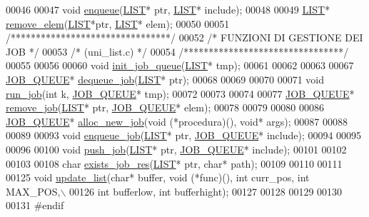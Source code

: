 \begin{DoxyCode}
00046 
00047 \textcolor{keywordtype}{void} \hyperlink{uni__list_8h_a47b764899ed23cda7335b2017b0492ad}{enqueue}(\hyperlink{struct____mialista____}{LIST}* ptr, \hyperlink{struct____mialista____}{LIST}* include);
00048 
00049 \hyperlink{struct____mialista____}{LIST}* \hyperlink{uni__list_8h_ac69f6919a0286577009ec0fbe00844bc}{remove_elem}(\hyperlink{struct____mialista____}{LIST}*ptr, \hyperlink{struct____mialista____}{LIST}* elem);
00050 
00051         \textcolor{comment}{/********************************/}
00052                         \textcolor{comment}{/* FUNZIONI DI GESTIONE DEI JOB */}
00053                         \textcolor{comment}{/*      (uni\_list.c)            */}
00054                         \textcolor{comment}{/********************************/}
00055 
00056 
00060 \textcolor{keywordtype}{void} \hyperlink{uni__list_8h_a5606f0504ed5a78f851f322d09cd0217}{init_job_queue}(\hyperlink{struct____mialista____}{LIST}* tmp);
00061 
00062 
00063 
00067 \hyperlink{structJOB__QUEUE}{JOB_QUEUE}* \hyperlink{uni__list_8h_a9bcd0be561081ab230c122ba31428104}{dequeue_job}(\hyperlink{struct____mialista____}{LIST}* ptr);
00068 
00069 
00070 
00071 \textcolor{keywordtype}{void} \hyperlink{uni__list_8h_a3a228945ba73b194700cec47b45a359c}{run_job}(\textcolor{keywordtype}{int} k, \hyperlink{structJOB__QUEUE}{JOB_QUEUE}* tmp);
00072 
00073 
00074 
00077 \hyperlink{structJOB__QUEUE}{JOB_QUEUE}* \hyperlink{uni__list_8h_a2b8166fc25329d89f6509e810ab670b2}{remove_job}(\hyperlink{struct____mialista____}{LIST}* ptr, \hyperlink{structJOB__QUEUE}{JOB_QUEUE}* elem);
00078 
00079 
00080 
00086 \hyperlink{structJOB__QUEUE}{JOB_QUEUE}* \hyperlink{uni__list_8h_a73b0293d6caa6d5c58b16ed26fa5f1e8}{alloc_new_job}(\textcolor{keywordtype}{void} (*procedura)(), \textcolor{keywordtype}{void}* args);
00087 
00088 
00089 
00093 \textcolor{keywordtype}{void} \hyperlink{uni__list_8h_ad605522765b4e3c23507f8ce39b5e797}{enqueue_job}(\hyperlink{struct____mialista____}{LIST}* ptr, \hyperlink{structJOB__QUEUE}{JOB_QUEUE}* include);
00094 
00095 
00096 
00100 \textcolor{keywordtype}{void} \hyperlink{uni__list_8h_ad32474e098b7a61c39496bf214207289}{push_job}(\hyperlink{struct____mialista____}{LIST}* ptr, \hyperlink{structJOB__QUEUE}{JOB_QUEUE}* include);
00101 
00102 
00103 
00108 \textcolor{keywordtype}{char} \hyperlink{uni__list_8h_a1b875b188f0d63832eb0832a507a095b}{exists_job_res}(\hyperlink{struct____mialista____}{LIST}* ptr, \textcolor{keywordtype}{char}* path);
00109 
00110 
00111 
00125 \textcolor{keywordtype}{void} \hyperlink{uni__list_8h_a656744c55192b9d6ec0d5d5d6f69ed3f}{update_list}(\textcolor{keywordtype}{char}* buffer, \textcolor{keywordtype}{void} (*func)(), \textcolor{keywordtype}{int} curr\_pos, \textcolor{keywordtype}{int} MAX\_POS,\(\backslash\)
00126         \textcolor{keywordtype}{int} bufferlow, \textcolor{keywordtype}{int} bufferhight);
00127 
00128 
00129 
00130 
00131 \textcolor{preprocessor}{#endif}
\end{DoxyCode}
